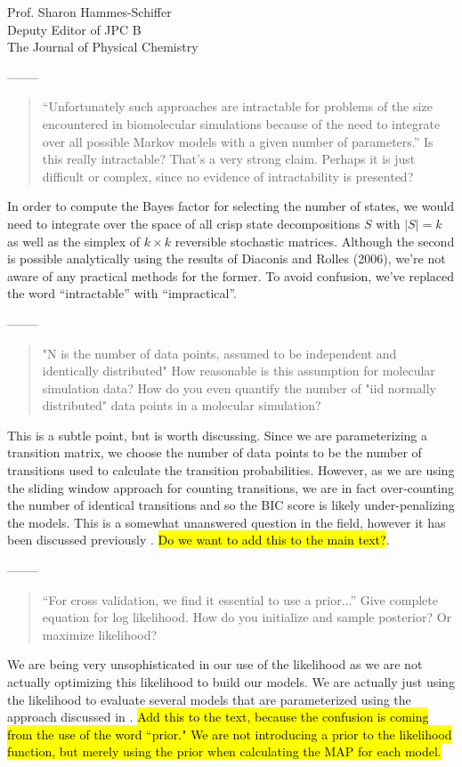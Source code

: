 \documentclass{letter}
\newcommand{\separate}{\begin{center}--------\end{center}}
\begin{document}
\begin{letter}{Prof. Sharon Hammes-Schiffer \\ Deputy Editor of JPC B \\ The Journal of Physical Chemistry}
\separate
\begin{quote}
``Unfortunately such approaches are intractable for problems of the size encountered in biomolecular simulations because of the need to integrate over all possible Markov models with a given number of parameters.''  Is this really intractable?  That's a very strong claim.  Perhaps it is just difficult or complex, since no evidence of intractability is presented?
\end{quote}

In order to compute the Bayes factor for selecting the number of states, we would need to integrate over the space of all crisp state decompositions $S$ with $|S|=k$ as well as the simplex of $k \times k$ reversible stochastic matrices. Although the second is possible analytically using the results of Diaconis and Rolles (2006), we're not aware of any practical methods for the former. To avoid confusion, we've replaced the word ``intractable'' with ``impractical''.


\separate
\begin{quote}
"N is the number of data points, assumed to be independent and identically distributed"  How reasonable is this assumption for molecular simulation data?  How do you even quantify the number of "iid normally distributed" data points in a molecular simulation?
\end{quote}

This is a subtle point, but is worth discussing. Since we are parameterizing a transition matrix, we choose the number of data points to be the number of transitions used to calculate the transition probabilities. However, as we are using the sliding window approach for counting transitions, we are in fact over-counting the number of identical transitions and so the BIC score is likely under-penalizing the models. This is a somewhat unanswered question in the field, however it has been discussed previously \cite{noe_sliding_window}. \hl{Do we want to add this to the main text?}.

\separate
\begin{quote}
``For cross validation, we find it essential to use a prior...''  Give complete equation for log likelihood.  How do you initialize and sample posterior?  Or maximize likelihood?
\end{quote}

We are being very unsophisticated in our use of the likelihood as we are not actually optimizing this likelihood to build our models. We are actually just using the likelihood to evaluate several models that are parameterized using the approach discussed in \cite{Beauchamp_msmb2}. \hl{Add this to the text, because the confusion is coming from the use of the word ``prior." We are not introducing a prior to the likelihood function, but merely using the prior when calculating the MAP for each model.}


\end{letter}
\end{document}
